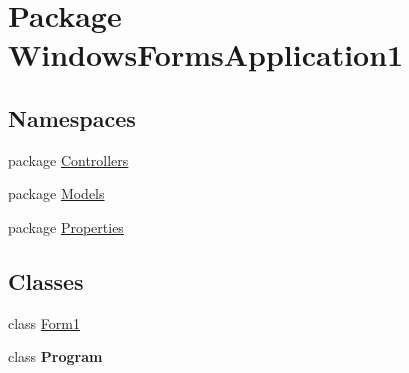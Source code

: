 \hypertarget{namespace_windows_forms_application1}{}\section{Package Windows\+Forms\+Application1}
\label{namespace_windows_forms_application1}
\subsection*{Namespaces}
\begin{DoxyCompactItemize}
\item 
package \hyperlink{namespace_windows_forms_application1_1_1_controllers}{Controllers}
\item 
package \hyperlink{namespace_windows_forms_application1_1_1_models}{Models}
\item 
package \hyperlink{namespace_windows_forms_application1_1_1_properties}{Properties}
\end{DoxyCompactItemize}
\subsection*{Classes}
\begin{DoxyCompactItemize}
\item 
class \hyperlink{class_windows_forms_application1_1_1_form1}{Form1}
\item 
class {\bfseries Program}
\end{DoxyCompactItemize}
